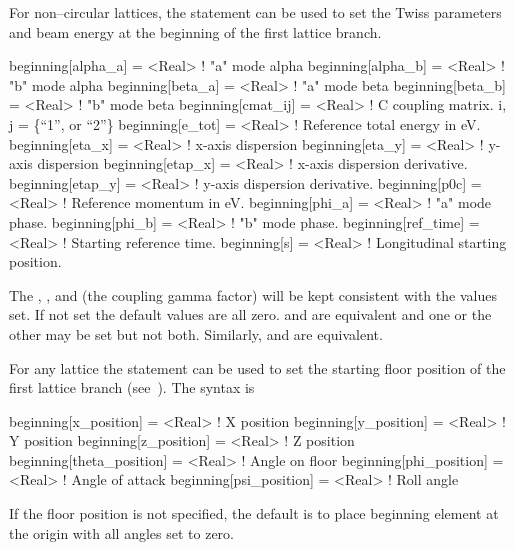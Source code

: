 For non--circular lattices, the  statement can be used to set the Twiss parameters and
beam energy at the beginning of the first lattice branch.
\begin{example}
  beginning[alpha_a]  = <Real>  ! "a" mode alpha
  beginning[alpha_b]  = <Real>  ! "b" mode alpha
  beginning[beta_a]   = <Real>  ! "a" mode beta
  beginning[beta_b]   = <Real>  ! "b" mode beta
  beginning[cmat_ij]  = <Real>  ! C coupling matrix. i, j = \{``1'', or ``2''\} 
  beginning[e_tot]    = <Real>  ! Reference total energy in eV.
  beginning[eta_x]    = <Real>  ! x-axis dispersion
  beginning[eta_y]    = <Real>  ! y-axis dispersion
  beginning[etap_x]   = <Real>  ! x-axis dispersion derivative.
  beginning[etap_y]   = <Real>  ! y-axis dispersion derivative.
  beginning[p0c]      = <Real>  ! Reference momentum in eV.
  beginning[phi_a]    = <Real>  ! "a" mode phase.
  beginning[phi_b]    = <Real>  ! "b" mode phase.
  beginning[ref_time] = <Real>  ! Starting reference time.
  beginning[s]        = <Real>  ! Longitudinal starting position.
\end{example}
The , , and  (the coupling gamma factor) will be kept consistent
with the values set. If not set the default values are all zero.   and
 are equivalent and one or the other may be set but not both. Similarly,
 and  are equivalent.

For any lattice the  statement can be used to set the starting floor position of the
first lattice branch (see~). The syntax is
\begin{example}
  beginning[x_position]     = <Real>  ! X position
  beginning[y_position]     = <Real>  ! Y position
  beginning[z_position]     = <Real>  ! Z position
  beginning[theta_position] = <Real>  ! Angle on floor
  beginning[phi_position]   = <Real>  ! Angle of attack
  beginning[psi_position]   = <Real>  ! Roll angle
\end{example}
If the floor position is not specified, the default is to place
beginning element at the origin with all angles set to zero.

